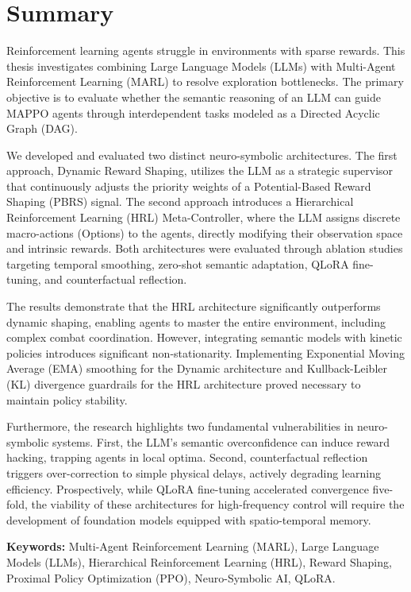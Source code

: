 \documentclass[11pt, a4paper]{article}
\begin{document}
\newpage

\section*{Summary}
Reinforcement learning agents struggle in environments with sparse rewards. This thesis investigates combining Large Language Models (LLMs) with Multi-Agent Reinforcement Learning (MARL) to resolve exploration bottlenecks. The primary objective is to evaluate whether the semantic reasoning of an LLM can guide MAPPO agents through interdependent tasks modeled as a Directed Acyclic Graph (DAG).

We developed and evaluated two distinct neuro-symbolic architectures. The first approach, Dynamic Reward Shaping, utilizes the LLM as a strategic supervisor that continuously adjusts the priority weights of a Potential-Based Reward Shaping (PBRS) signal. The second approach introduces a Hierarchical Reinforcement Learning (HRL) Meta-Controller, where the LLM assigns discrete macro-actions (Options) to the agents, directly modifying their observation space and intrinsic rewards. Both architectures were evaluated through ablation studies targeting temporal smoothing, zero-shot semantic adaptation, QLoRA fine-tuning, and counterfactual reflection.

The results demonstrate that the HRL architecture significantly outperforms dynamic shaping, enabling agents to master the entire environment, including complex combat coordination. However, integrating semantic models with kinetic policies introduces significant non-stationarity. Implementing Exponential Moving Average (EMA) smoothing for the Dynamic architecture and Kullback-Leibler (KL) divergence guardrails for the HRL architecture proved necessary to maintain policy stability. 

Furthermore, the research highlights two fundamental vulnerabilities in neuro-symbolic systems. First, the LLM's semantic overconfidence can induce reward hacking, trapping agents in local optima. Second, counterfactual reflection triggers over-correction to simple physical delays, actively degrading learning efficiency. Prospectively, while QLoRA fine-tuning accelerated convergence five-fold, the viability of these architectures for high-frequency control will require the development of foundation models equipped with spatio-temporal memory.

\textbf{Keywords:} Multi-Agent Reinforcement Learning (MARL), Large Language Models (LLMs), Hierarchical Reinforcement Learning (HRL), Reward Shaping, Proximal Policy Optimization (PPO), Neuro-Symbolic AI, QLoRA.
\end{document}
